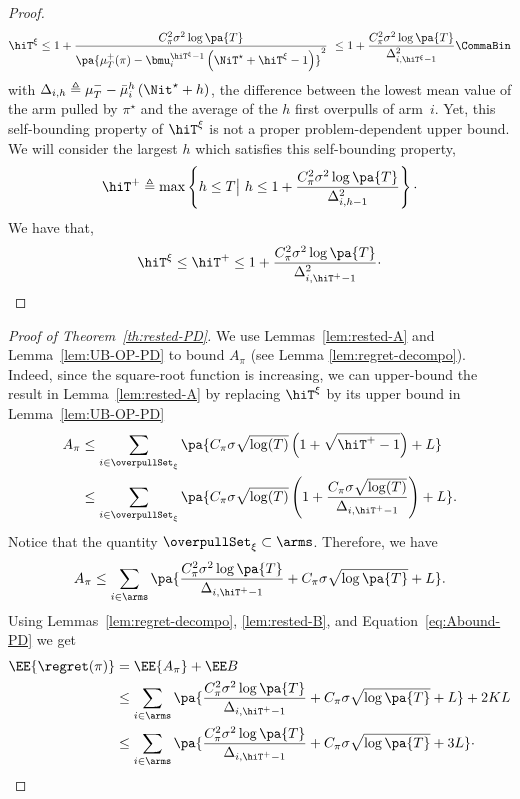 \begin{proof}
\[
\hiT^\xi \leq 1 + \frac{C_\pi^2 \sigma^2\log\pa{T}}{\pa{\mu_T^+(\pi)- \bmu_i^{\hiT^\xi  - 1} \left( \NiT^\star + \hiT^\xi   - 1 \right) }^2 }\ \leq 1 + \frac{C_\pi^2 \sigma^2\log\pa{T}}{\Delta_{i,\hiT^\xi  - 1}^2}\CommaBin
\] 
with $\Delta_{i,h} \triangleq \mu^-_T- \bar{\mu}_i^h\left( \Nit^\star+h \right)$, the difference between the lowest mean value of the arm pulled by $\pi^\star$ and the average of the $h$ first overpulls of arm~$i$. Yet, this self-bounding property of $\hiT^\xi $ is not a proper problem-dependent upper bound. We will consider the largest $h$ which satisfies this self-bounding property, 
\begin{equation*}
 \hiT^+  \triangleq \max \left\{ h \leq T \big| \ h \leq  1 + \frac{C_\pi^2 \sigma^2 \log \pa{T}}{\Delta_{i,h-1}^2} \right\}\cdot
\end{equation*}
We have that,
\begin{equation*}
\hiT^\xi \leq  \hiT^+  \leq  1 + \frac{C_\pi^2 \sigma^2 \log \pa{T}}{\Delta_{i,\hiT^+-1}^2}\cdot
\end{equation*}
\end{proof}

\begin{proof}[Proof of Theorem~\ref{th:rested-PD}]
We use Lemmas~\ref{lem:rested-A} and Lemma~\ref{lem:UB-OP-PD} to bound $A_\pi$ (see Lemma \ref{lem:regret-decompo}). Indeed, since the square-root function is increasing, we can upper-bound the result in Lemma~\ref{lem:rested-A} by replacing $\hiT^\xi$ by its upper bound in Lemma~\ref{lem:UB-OP-PD}
\begin{align*}
A_{\pi} &\leq \sum_{i\in \overpullSet_\xi} \pa{C_\pi \sigma\sqrt{\log(T)} \left( 1 + \sqrt{\hiT^+ - 1}\right) + L}\\
& \leq \sum_{i\in \overpullSet_\xi} \pa{C_\pi \sigma\sqrt{\log(T)} \left( 1 + \frac{C_\pi \sigma\sqrt{\log(T)}}{\Delta_{i,\hiT^+-1}}\right) + L}. 
\end{align*}
Notice that the quantity $\overpullSet_\xi \subset \arms$. Therefore, we have 
\begin{equation}
\label{eq:Abound-PD}
A_{\pi} \leq \sum_{i\in \arms} \pa{\frac{C_\pi^2\sigma^2\log\pa{T}}{\Delta_{i,\hiT^+-1}} + C_\pi \sigma \sqrt{\log\pa{T}} +L }. 
\end{equation}
Using Lemmas~\ref{lem:regret-decompo}, \ref{lem:rested-B}, and Equation~\ref{eq:Abound-PD} we get
\begin{align*}
\EE{\regret(\pi)} &=\EE{A_{\pi}} + \EE B 
\\&
\leq \sum_{i\in \arms} \pa{\frac{C_\pi^2\sigma^2\log\pa{T}}{\Delta_{i,\hiT^+-1}} + C_\pi \sigma \sqrt{\log\pa{T}} +L } + 2KL \\
&\leq \sum_{i\in \arms} \pa{\frac{C_\pi^2\sigma^2\log\pa{T}}{\Delta_{i,\hiT^+-1}} + C_\pi \sigma \sqrt{\log\pa{T}} +3L } \cdot
\end{align*}
\end{proof}